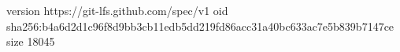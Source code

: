 version https://git-lfs.github.com/spec/v1
oid sha256:b4a6d2d1c96f8d9bb3cb11edb5dd219fd86acc31a40bc633ac7e5b839b7147ce
size 18045
